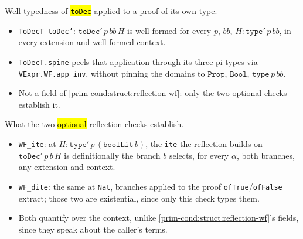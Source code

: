 \begin{definition}
  \label{prim-cond:def:reflection-todect}
  \leanok

   Well-typedness of \hl{\texttt{toDec}} applied to a proof of its own type.
  \begin{itemize}
  \item \texttt{ToDecT toDec'}: $\mathtt{toDec}'\,p\,bb\,H$ is well formed for every $p$, $bb$, $H :
    \mathtt{type}'\,p\,bb$, in every extension and well-formed context.
  \item \texttt{ToDecT.spine} peels that application through its three pi types via
    \texttt{VExpr.WF.app\_inv}, without pinning the domains to $\mathtt{Prop}$, $\mathtt{Bool}$,
    $\mathtt{type}\,p\,bb$.
  \item {} Not a field of \ref{prim-cond:struct:reflection-wf}: only the two optional
    checks establish it.
  \end{itemize}
\end{definition}

\begin{definition}
  \label{prim-cond:def:reflection-wf-ite-dite}
  \leanok

   What the two \hl{optional} reflection checks establish.
  \begin{itemize}
  \item \texttt{WF\_ite}: at $H : \mathtt{type}'\,p\,(\mathtt{boolLit}\,b)$, the \texttt{ite} the
    reflection builds on $\mathtt{toDec}'\,p\,b\,H$ is definitionally the branch $b$ selects, for
    every $\alpha$, both branches, any extension and context.
  \item \texttt{WF\_dite}: the same at \texttt{Nat}, branches applied to the proof
    \texttt{ofTrue}/\texttt{ofFalse} extract; those two are existential, since only this check
    types them.
  \item Both quantify over the context, unlike \ref{prim-cond:struct:reflection-wf}'s fields,
    since they speak about the caller's terms.
  \end{itemize}
\end{definition}

